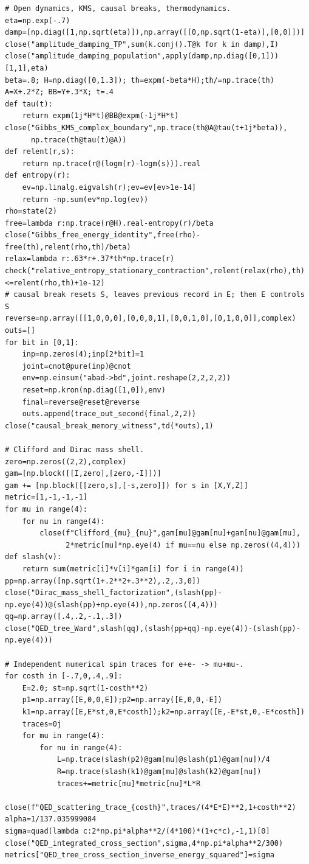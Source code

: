 \documentclass[
  11pt,
  oneside]{book}
\begin{document}
\begin{Verbatim}[breaklines,breakanywhere,fontsize=\scriptsize]
# Open dynamics, KMS, causal breaks, thermodynamics.
eta=np.exp(-.7)
damp=[np.diag([1,np.sqrt(eta)]),np.array([[0,np.sqrt(1-eta)],[0,0]])]
close("amplitude_damping_TP",sum(k.conj().T@k for k in damp),I)
close("amplitude_damping_population",apply(damp,np.diag([0,1]))[1,1],eta)
beta=.8; H=np.diag([0,1.3]); th=expm(-beta*H);th/=np.trace(th)
A=X+.2*Z; BB=Y+.3*X; t=.4
def tau(t):
    return expm(1j*H*t)@BB@expm(-1j*H*t)
close("Gibbs_KMS_complex_boundary",np.trace(th@A@tau(t+1j*beta)),
      np.trace(th@tau(t)@A))
def relent(r,s):
    return np.trace(r@(logm(r)-logm(s))).real
def entropy(r):
    ev=np.linalg.eigvalsh(r);ev=ev[ev>1e-14]
    return -np.sum(ev*np.log(ev))
rho=state(2)
free=lambda r:np.trace(r@H).real-entropy(r)/beta
close("Gibbs_free_energy_identity",free(rho)-free(th),relent(rho,th)/beta)
relax=lambda r:.63*r+.37*th*np.trace(r)
check("relative_entropy_stationary_contraction",relent(relax(rho),th)<=relent(rho,th)+1e-12)
# causal break resets S, leaves previous record in E; then E controls S
reverse=np.array([[1,0,0,0],[0,0,0,1],[0,0,1,0],[0,1,0,0]],complex)
outs=[]
for bit in [0,1]:
    inp=np.zeros(4);inp[2*bit]=1
    joint=cnot@pure(inp)@cnot
    env=np.einsum("abad->bd",joint.reshape(2,2,2,2))
    reset=np.kron(np.diag([1,0]),env)
    final=reverse@reset@reverse
    outs.append(trace_out_second(final,2,2))
close("causal_break_memory_witness",td(*outs),1)

# Clifford and Dirac mass shell.
zero=np.zeros((2,2),complex)
gam=[np.block([[I,zero],[zero,-I]])]
gam += [np.block([[zero,s],[-s,zero]]) for s in [X,Y,Z]]
metric=[1,-1,-1,-1]
for mu in range(4):
    for nu in range(4):
        close(f"Clifford_{mu}_{nu}",gam[mu]@gam[nu]+gam[nu]@gam[mu],
              2*metric[mu]*np.eye(4) if mu==nu else np.zeros((4,4)))
def slash(v):
    return sum(metric[i]*v[i]*gam[i] for i in range(4))
pp=np.array([np.sqrt(1+.2**2+.3**2),.2,.3,0])
close("Dirac_mass_shell_factorization",(slash(pp)-np.eye(4))@(slash(pp)+np.eye(4)),np.zeros((4,4)))
qq=np.array([.4,.2,-.1,.3])
close("QED_tree_Ward",slash(qq),(slash(pp+qq)-np.eye(4))-(slash(pp)-np.eye(4)))

# Independent numerical spin traces for e+e- -> mu+mu-.
for costh in [-.7,0,.4,.9]:
    E=2.0; st=np.sqrt(1-costh**2)
    p1=np.array([E,0,0,E]);p2=np.array([E,0,0,-E])
    k1=np.array([E,E*st,0,E*costh]);k2=np.array([E,-E*st,0,-E*costh])
    traces=0j
    for mu in range(4):
        for nu in range(4):
            L=np.trace(slash(p2)@gam[mu]@slash(p1)@gam[nu])/4
            R=np.trace(slash(k1)@gam[mu]@slash(k2)@gam[nu])
            traces+=metric[mu]*metric[nu]*L*R
    close(f"QED_scattering_trace_{costh}",traces/(4*E*E)**2,1+costh**2)
alpha=1/137.035999084
sigma=quad(lambda c:2*np.pi*alpha**2/(4*100)*(1+c*c),-1,1)[0]
close("QED_integrated_cross_section",sigma,4*np.pi*alpha**2/300)
metrics["QED_tree_cross_section_inverse_energy_squared"]=sigma


\end{Verbatim}
\end{document}

